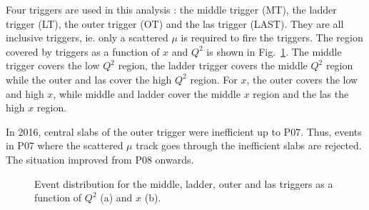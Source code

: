 Four triggers are used in this analysis : the middle trigger (MT), the ladder trigger (LT), the outer trigger (OT) and the las trigger (LAST). They are all inclusive triggers, ie. only a scattered $\mu$ is required to fire the triggers. The region covered by triggers as a function of $x$ and $Q^2$ is shown in Fig.~\ref{pic:triggerxQ2}. The middle trigger covers the low $Q^2$ region, the ladder trigger covers the middle $Q^2$ region while the outer and las cover the high $Q^2$ region. For $x$, the outer covers the low and high $x$, while middle and ladder cover the middle $x$ region and the las the high $x$ region.

In 2016, central slabs of the outer trigger were inefficient up to P$07$. Thus, events in P$07$ where the scattered $\mu$ track goes through the inefficient slabs are rejected. The situation improved from P$08$ onwards.

\begin{figure}[!h]
	\caption{Event distribution for the middle, ladder, outer and las triggers as a function of $Q^2$ (a) and $x$ (b).}
	\label{pic:triggerxQ2}
\end{figure}

